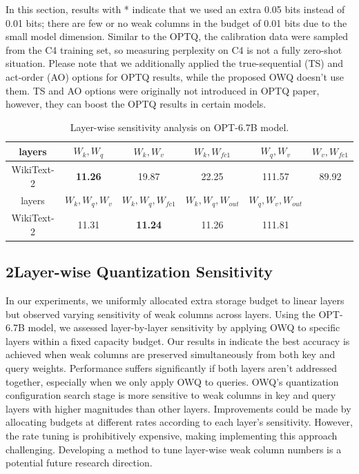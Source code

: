 \documentclass[letterpaper]{article} %
\begin{document}
In this section, results with * indicate that we used an extra 0.05 bits instead of 0.01 bits; there are few or no weak columns in the budget of 0.01 bits due to the small model dimension. Similar to the OPTQ, the calibration data were sampled from the C4 training set, so measuring perplexity on C4 is not a fully zero-shot situation. Please note that we additionally applied the true-sequential (TS) and act-order (AO) options for OPTQ results, while the proposed OWQ doesn't use them. TS and AO options were originally not introduced in OPTQ paper, however, they can boost the OPTQ results in certain models.


\begin{table}[t]
    \centering
    \small
    \setlength\tabcolsep{4pt}
    \begin{tabular}{ c | c | c | c | c | c }
    \toprule
    layers & $W_{k}, W_{q}$ & $W_{k}, W_{v}$ & $W_{k}, W_{fc1}$ & $W_{q}, W_{v}$ & $W_{v}, W_{fc1}$ \\
    \midrule
    WikiText-2 & \textbf{11.26} & 19.87 & 22.25 & 111.57 & 89.92 \\
    \midrule
    layers & $W_{k}, W_{q}, W_{v}$ & $W_{k}, W_{q}, W_{fc1}$ & $W_{k}, W_{q}, W_{out}$ & $W_{q}, W_{v}, W_{out}$ \\
    \midrule
    WikiText-2 & 11.31 & \textbf{11.24} & 11.26 & 111.81 \\
    \bottomrule
   \end{tabular}
   \caption{Layer-wise sensitivity analysis on OPT-6.7B model.}
   \label{table:layer_sweep}
\end{table}

\subsection*{2\quad Layer-wise Quantization Sensitivity}

In our experiments, we uniformly allocated extra storage budget to linear layers but observed varying sensitivity of weak columns across layers. Using the OPT-6.7B model, we assessed layer-by-layer sensitivity by applying OWQ to specific layers within a fixed capacity budget. Our results in  indicate the best accuracy is achieved when weak columns are preserved simultaneously from both key and query weights. Performance suffers significantly if both layers aren't addressed together, especially when we only apply OWQ to queries. OWQ's quantization configuration search stage is more sensitive to weak columns in key and query layers with higher magnitudes than other layers. Improvements could be made by allocating budgets at different rates according to each layer's sensitivity. However, the rate tuning is prohibitively expensive, making implementing this approach challenging. Developing a method to tune layer-wise weak column numbers is a potential future research direction.
\end{document}
